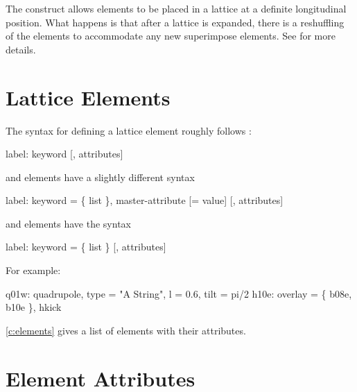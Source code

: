 The  construct allows elements to be placed in a
lattice at a definite longitudinal position. What happens is that
after a lattice is expanded, there is a reshuffling of the elements to
accommodate any new superimpose elements. See  for more
details.

\section{Lattice Elements}

The syntax for defining a lattice element roughly follows \mad:
\begin{example}
  label: keyword [, attributes]
\end{example}
 and  elements have a slightly different syntax
\begin{example}
  label: keyword = \{ list \}, master-attribute [= value] [, attributes]
\end{example}
and  elements have the syntax
\begin{example}
  label: keyword = \{ list \} [, attributes]
\end{example}  
For example:
\begin{example}
  q01w: quadrupole, type = "A String", l = 0.6, tilt = pi/2
  h10e: overlay = \{ b08e, b10e \}, hkick
\end{example}

\cref{c:elements} gives a list of elements with their attributes.

\section{Element Attributes}

